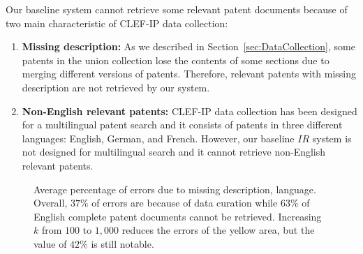 Our baseline system cannot retrieve some relevant patent documents because of two main characteristic of CLEF-IP data collection: 
\begin{enumerate}

\item \textbf{Missing description: } As we described in Section~\ref{sec:DataCollection}, some patents in the union collection lose the contents of some sections due to merging different versions of patents. Therefore, relevant patents with missing description are not retrieved by our system.
\item \textbf{Non-English relevant patents: } CLEF-IP data collection has been designed for a multilingual patent search and it consists of patents in three different languages: English, German, and French. However, our baseline $\mathit{IR}$ system is not designed for multilingual search and it cannot retrieve non-English relevant patents.   
\end{enumerate}
\begin{figure}[t!]
\begin{centering}
\par\end{centering} 
\protect\caption{Average percentage of errors due to missing description, language. Overall, $37\%$ of errors are because of data curation while $63\%$ of English complete patent documents cannot be retrieved. Increasing $k$ from $100$ to $1,000$ reduces the errors of the yellow area, but the value of $42\%$ is still notable.}
\label{fig:datacuration}
\end{figure}

